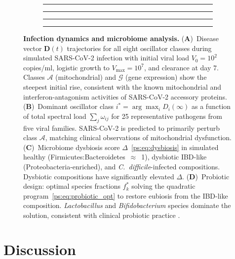 \begin{figure}[t]
\centering
\begin{subfigure}[b]{0.23\textwidth}
  \rule{\textwidth}{0.6\textwidth}
  \caption{}
  \label{ps:fig:dyn_trajectory}
\end{subfigure}
\hfill
\begin{subfigure}[b]{0.23\textwidth}
  \rule{\textwidth}{0.6\textwidth}
  \caption{}
  \label{ps:fig:dyn_dominant}
\end{subfigure}
\hfill
\begin{subfigure}[b]{0.23\textwidth}
  \rule{\textwidth}{0.6\textwidth}
  \caption{}
  \label{ps:fig:micro_dysbiosis}
\end{subfigure}
\hfill
\begin{subfigure}[b]{0.23\textwidth}
  \rule{\textwidth}{0.6\textwidth}
  \caption{}
  \label{ps:fig:micro_probiotic}
\end{subfigure}
\caption{\textbf{Infection dynamics and microbiome analysis.}
(\textbf{A})~Disease vector $\mathbf{D}(t)$ trajectories for all eight
oscillator classes during simulated SARS-CoV-2 infection with initial viral
load $V_0 = 10^2$ copies/ml, logistic growth to $V_{\max} = 10^7$, and
clearance at day 7. Classes $\mathcal{A}$ (mitochondrial) and $\mathcal{G}$
(gene expression) show the steepest initial rise, consistent with the known
mitochondrial and interferon-antagonism activities of SARS-CoV-2 accessory
proteins.
(\textbf{B})~Dominant oscillator class $i^* = \arg\max_i D_i(\infty)$ as a
function of total spectral load $\sum_j \omega_{ij}$ for 25 representative
pathogens from five viral families. SARS-CoV-2 is predicted to primarily
perturb class $\mathcal{A}$, matching clinical observations of mitochondrial
dysfunction.
(\textbf{C})~Microbiome dysbiosis score $\Delta$~\eqref{ps:eq:dysbiosis} in
simulated healthy (Firmicutes:Bacteroidetes~$\approx$~1), dysbiotic IBD-like
(Proteobacteria-enriched), and \textit{C.~difficile}-infected compositions.
Dysbiotic compositions have significantly elevated $\Delta$.
(\textbf{D})~Probiotic design: optimal species fractions $f_k^*$ solving the
quadratic program~\eqref{ps:eq:probiotic_opt} to restore eubiosis from the
IBD-like composition. \textit{Lactobacillus} and \textit{Bifidobacterium}
species dominate the solution, consistent with clinical probiotic practice
\citep{turnbaugh2006}.}
\label{ps:fig:dynamics}
\end{figure}

\section{Discussion}
\label{ps:sec:discussion}

